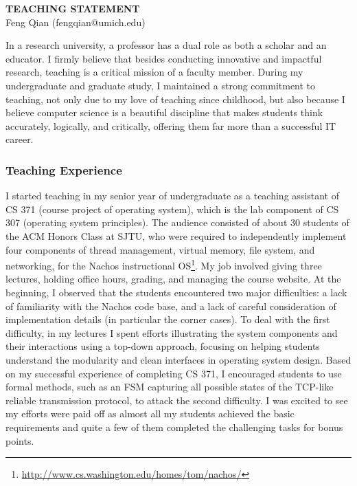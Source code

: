 \documentclass[10pt]{article}
\begin{document}
\begin{small}

\begin{center}
{\LARGE \bf TEACHING STATEMENT}\\
\vspace*{0.1cm}
{\normalsize Feng Qian (fengqian@umich.edu)}
\end{center}



In a research university, a professor has a dual role as both a scholar and an educator. I firmly believe that besides conducting innovative and impactful research, teaching is a critical mission of a faculty member. During my undergraduate and graduate study, I maintained a strong commitment to teaching, not only due to my love of teaching since childhood, but also because I believe computer science is a beautiful discipline that makes students think accurately, logically, and critically, offering them far more than a successful IT career.

\subsubsection*{Teaching Experience}

I started teaching in my senior year of undergraduate as a teaching assistant of CS 371 (course project of operating system), which is the lab component of CS 307 (operating system principles). The audience consisted of about 30 students of the ACM Honors Class at SJTU, who were required to independently implement four components of thread management, virtual memory, file system, and networking, for the Nachos instructional OS\footnote{\url{http://www.cs.washington.edu/homes/tom/nachos/}}. My job involved giving three lectures, holding office hours, grading, and managing the course website. At the beginning, I observed that the students encountered two major difficulties: a lack of familiarity with the Nachos code base, and a lack of careful consideration of implementation details (in particular the corner cases). To deal with the first difficulty, in my lectures I spent efforts illustrating the system components and their interactions using a top-down approach, focusing on helping students understand the modularity and clean interfaces in operating system design. Based on my successful experience of completing CS 371, I encouraged students to use formal methods, such as an FSM capturing all possible states of the TCP-like reliable transmission protocol, to attack the second difficulty. I was excited to see my efforts were paid off as almost all my students achieved the basic requirements and quite a few of them completed the challenging tasks for bonus points.


\end{small}
\end{document}
